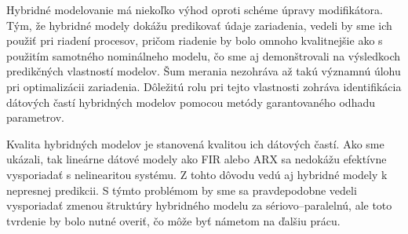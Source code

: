 Hybridné modelovanie má niekoľko výhod oproti schéme úpravy modifikátora. Tým, že hybridné modely dokážu predikovať údaje zariadenia, vedeli by sme ich použiť pri riadení procesov, pričom riadenie by bolo omnoho kvalitnejšie ako s použitím samotného nominálneho modelu, čo sme aj demonštrovali na výsledkoch predikčných vlastností modelov. Šum merania nezohráva až takú významnú úlohu pri optimalizácii zariadenia. Dôležitú rolu pri tejto vlastnosti zohráva identifikácia dátových častí hybridných modelov pomocou metódy garantovaného odhadu parametrov. 

Kvalita hybridných modelov je stanovená kvalitou ich dátových častí. Ako sme ukázali, tak lineárne dátové modely ako FIR alebo ARX sa nedokážu efektívne vysporiadať s nelinearitou systému. Z tohto dôvodu vedú aj hybridné modely k nepresnej predikcii. S týmto problémom by sme sa pravdepodobne vedeli vysporiadať zmenou štruktúry hybridného modelu za sériovo--paralelnú, ale toto tvrdenie by bolo nutné overiť, čo môže byť námetom na ďalšiu prácu.